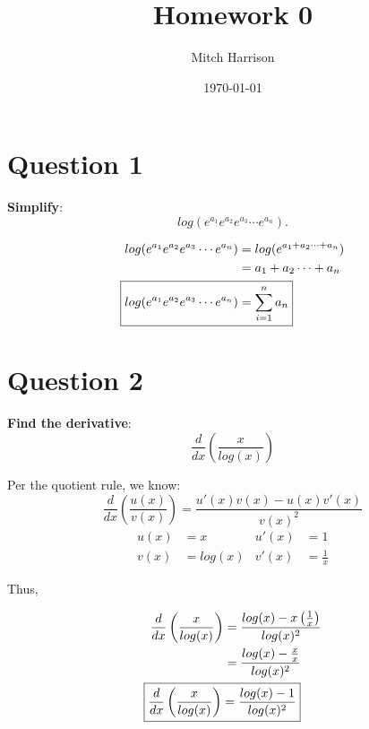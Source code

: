 \documentclass[titlepage, 12pt, leqno]{article}
\title{\Huge{Homework 0}}
\author{\large{Mitch Harrison}}
\date{\today}
\begin{document}
\setlength{\parskip}{1\baselineskip}
\setlength{\parindent}{15pt}
\maketitle
\newpage


\section{Question 1}
\begin{ex}
    \textbf{Simplify}:
    \[
        log(e^{a_1}e^{a_2}e^{a_3} \cdots e^{a_n}).
    \]
\end{ex}

\begin{align*}
    log(e^{a_1}e^{a_2}e^{a_3} \cdots e^{a_n}) &= log(e^{a_1+a_2 \cdots +a_n}) \\
                                              &= a_1+a_2 \cdots +a_n \\
    \Aboxed{log(e^{a_1}e^{a_2}e^{a_3} \cdots e^{a_n}) &= \sum_{i=1}^{n}a_n}
\end{align*}

\section{Question 2}
\begin{ex}
    \textbf{Find the derivative}:
    \[
        \frac{d}{dx}\left( \frac{x}{log(x)}\right)
    \]
\end{ex}

Per the quotient rule, we know:
\[
    \frac{d}{dx}\left(\frac{u(x)}{v(x)}\right) = \frac{u'(x)v(x) - 
    u(x)v'(x)}{v(x)^{2}}
\]
\begin{align*}
    u(x) &= x & u'(x) &= 1 \\
    v(x) &= log(x) & v'(x) &= \frac{1}{x}
\end{align*}

Thus,

\begin{align*}
    \frac{d}{dx}\left(\frac{x}{log(x)}\right) &= \frac{
        log(x) - x\left(\frac{1}{x}\right)}{log(x)^{2}} \\
        &= \frac{log(x) - \frac{x}{x}}{log(x)^{2}} \\
        \Aboxed{\frac{d}{dx}\left(\frac{x}{log(x)}\right) &=
        \frac{log(x) - 1}{log(x)^{2}}} 
\end{align*}
\end{document}
